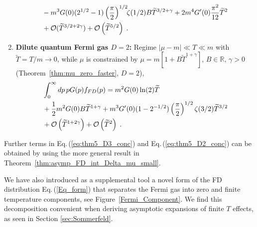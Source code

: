 \documentclass[sn-mathphys,Numbered]{sn-jnl}
\newcommand{\req}[1]{Eq.\,(\ref{#1})}
\newcommand{\rf}[1]{Figure~{\ref{#1}}}
\newcommand{\rTh}[1]{Theorem~{\ref{#1}}}
\begin{document}
\begin{enumerate}
\begin{align}
 &- m^{3}G(0)({2}^{1/2}-1)\left(\frac{\pi}{2}\right)^{1/2}\!\!\zeta(1/2)B\widetilde{T}^{3/2+\gamma} +2m^{4}G^\prime(0) \frac{\pi^2}{12}\widetilde{T}^{2}\notag\\
 &+\mathcal{O}(\widetilde{T}^{3/2+2\gamma})+ \mathcal{O}\left(\widetilde{T}^{5/2}\right)\;. \notag
\end{align} 
\item  
{\bf Dilute quantum Fermi gas $D=2$:} Regime $|\mu-m|\ll T\ll m$ with  $\widetilde{T}=T/m\to 0$, while $\mu$ is constrained by $\mu=m[1+B\widetilde{T}^{1+\gamma}]$, $B\in\mathbb{R}$, $\gamma>0$ (\rTh{thm:mu_zero_faster}, $D=2$),
\begin{align}
&\int_0^\infty dp\, p G(p) f_{FD}(p)=m^{2}G(0)\ln(2)\widetilde{T} \label{eq:thm5_D2_conc}\\
 &+\frac{1}{2}m^{2}G(0)B\widetilde{T}^{1+\gamma}+m^{3}G^\prime(0)(1 - 2^{-1/2}) \left(\frac{\pi}{2}\right)^{1/2} \zeta(3/2)\widetilde{T}^{3/2}\notag\\
 &+\mathcal{O}\left(\widetilde{T}^{1+2\gamma}\right)+\mathcal{O}\left(\widetilde{T}^{2}\right)\;.\notag
\end{align} 
\end{enumerate}
Further terms in \req{eq:thm5_D3_conc} and \req{eq:thm5_D2_conc} can be obtained by using the more general result in  \rTh{thm:asymp_FD_int_Delta_mu_small}.

We have also introduced as a supplemental tool a novel form of the FD distribution \req{Eq_form} that separates the Fermi gas into zero and finite temperature components, see \rf{Fermi_Component}. We find this decomposition convenient when deriving asymptotic expansions of finite $T$ effects, as seen in Section \ref{sec:Sommerfeld}.%
\end{document}
